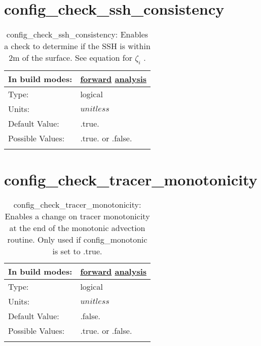 \section[config\_check\_ssh\_consistency]{config\_check\_ssh\_consistency}
\label{sec:nm_sec_config_check_ssh_consistency}
\begin{center}
\begin{longtable}{| p{2.0in} || p{4.0in} |}
    \hline
    In build modes: & \hyperref[subsec:forward_nm_tab_partial_bottom_cells]{forward} \hyperref[subsec:analysis_nm_tab_partial_bottom_cells]{analysis} \\
    \hline
    Type: & logical \\
    \hline
    Units: & $unitless$ \\
    \hline
    Default Value: & .true. \\
    \hline
    Possible Values: & .true. or .false. \\
    \hline
    \caption{config\_check\_ssh\_consistency:  Enables a check to determine if the SSH is within 2m of the surface.  See equation for  $\zeta_i$ .}
\end{longtable}
\end{center}
\section[config\_check\_tracer\_monotonicity]{config\_check\_tracer\_monotonicity}
\label{sec:nm_sec_config_check_tracer_monotonicity}
\begin{center}
\begin{longtable}{| p{2.0in} || p{4.0in} |}
    \hline
    In build modes: & \hyperref[subsec:forward_nm_tab_debug]{forward} \hyperref[subsec:analysis_nm_tab_debug]{analysis} \\
    \hline
    Type: & logical \\
    \hline
    Units: & $unitless$ \\
    \hline
    Default Value: & .false. \\
    \hline
    Possible Values: & .true. or .false. \\
    \hline
    \caption{config\_check\_tracer\_monotonicity: Enables a change on tracer monotonicity at the end of the monotonic advection routine. Only used if config\_monotonic is set to .true.}
\end{longtable}
\end{center}
